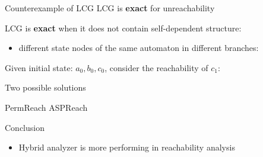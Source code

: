 \documentclass[8pt]{beamer}
\begin{document}
\begin{frame}{Counterexample of LCG}
LCG is \textbf{exact} for unreachability 

LCG is \textbf{exact} when it does not contain self-dependent structure:
\begin{itemize}
\item different state nodes of the same automaton in different branches:
\end{itemize}
Given initial state: $a_0,b_0,c_0$, consider the reachability of $c_1$:
\begin{figure}
    
\end{figure}


\end{frame}

\begin{frame}{Two possible solutions}
    
    PermReach ASPReach
\end{frame}

\begin{frame}{Conclusion}
\begin{itemize}
    \item Hybrid analyzer is more performing in reachability analysis
\end{itemize}

\end{frame}
\end{document}
